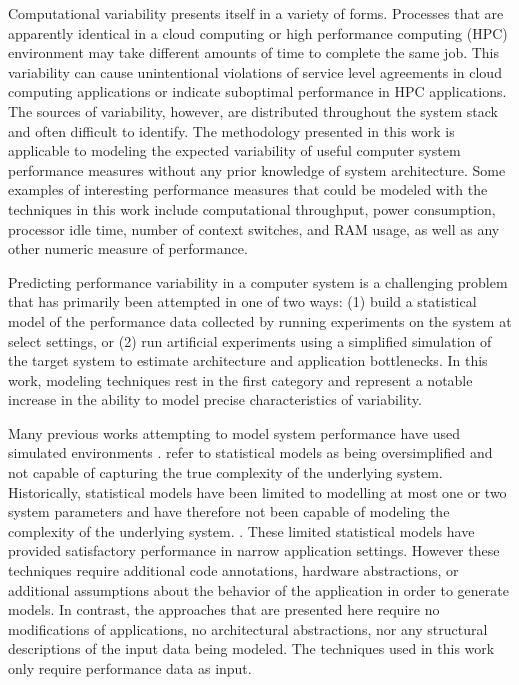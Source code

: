 
Computational variability presents itself in a variety of forms. Processes that are apparently identical in a cloud computing or high performance computing (HPC) environment may take different amounts of time to complete the same job. This variability can cause unintentional violations of service level agreements in cloud computing applications or indicate suboptimal performance in HPC applications. The sources of variability, however, are distributed throughout the system stack and often difficult to identify. The methodology presented in this work is applicable to modeling the expected variability of useful computer system performance measures without any prior knowledge of system architecture. Some examples of interesting performance measures that could be modeled with the techniques in this work include computational throughput, power consumption, processor idle time, number of context switches, and RAM usage, as well as any other numeric measure of performance.

Predicting performance variability in a computer system is a challenging problem that has primarily been attempted in one of two ways: (1) build a statistical model of the performance data collected by running experiments on the system at select settings, or (2) run artificial experiments using a simplified simulation of the target system to estimate architecture and application bottlenecks. In this work, modeling techniques rest in the first category and represent a notable increase in the ability to model precise characteristics of variability.

Many previous works attempting to model system performance have used simulated environments \cite{grobelny2007fase,wang2009simulation,wang2013towards}. \citet{grobelny2007fase} refer to statistical models as being oversimplified and not capable of capturing the true complexity of the underlying system. Historically, statistical models have been limited to modelling at most one or two system parameters and have therefore not been capable of modeling the complexity of the underlying system. \cite{snavely2002framework,bailey2005performance,barker2009using,ye2010analyzing}. These limited statistical models have provided satisfactory performance in narrow application settings. However these techniques require additional code annotations, hardware abstractions, or additional assumptions about the behavior of the application in order to generate models. In contrast, the approaches that are presented here require no modifications of applications, no architectural abstractions, nor any structural descriptions of the input data being modeled. The techniques used in this work only require performance data as input.

